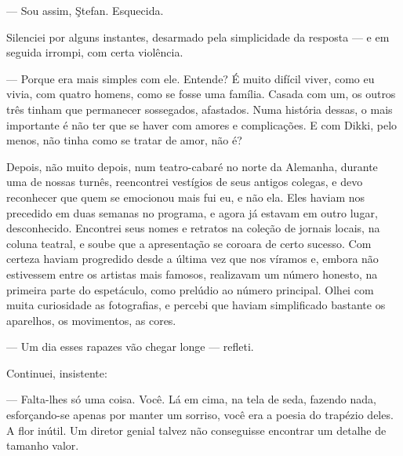 --- Sou assim, Ştefan. Esquecida.

Silenciei por alguns instantes, desarmado pela simplicidade da resposta
--- e em seguida irrompi, com certa violência.


--- Porque era mais simples com ele. Entende? É muito difícil viver,
como eu vivia, com quatro homens, como se fosse uma família. Casada com
um, os outros três tinham que permanecer sossegados, afastados. Numa
história dessas, o mais importante é não ter que se haver com amores e
complicações. E com Dikki, pelo menos, não tinha como se tratar de amor,
não é?


Depois, não muito depois, num teatro-cabaré no norte da Alemanha,
durante uma de nossas turnês, reencontrei vestígios de seus antigos
colegas, e devo reconhecer que quem se emocionou mais fui eu, e não ela.
Eles haviam nos precedido em duas semanas no programa, e agora já
estavam em outro lugar, desconhecido. Encontrei seus nomes e retratos na
coleção de jornais locais, na coluna teatral, e soube que a apresentação
se coroara de certo sucesso. Com certeza haviam progredido desde a
última vez que nos víramos e, embora não estivessem entre os artistas
mais famosos, realizavam um número honesto, na primeira parte do
espetáculo, como prelúdio ao número principal. Olhei com muita
curiosidade as fotografias, e percebi que haviam simplificado bastante
os aparelhos, os movimentos, as cores.

--- Um dia esses rapazes vão chegar longe --- refleti.



Continuei, insistente:

--- Falta-lhes só uma coisa. Você. Lá em cima, na tela de seda, fazendo
nada, esforçando-se apenas por manter um sorriso, você era a poesia do
trapézio deles. A flor inútil. Um diretor genial talvez não conseguisse
encontrar um detalhe de tamanho valor.

